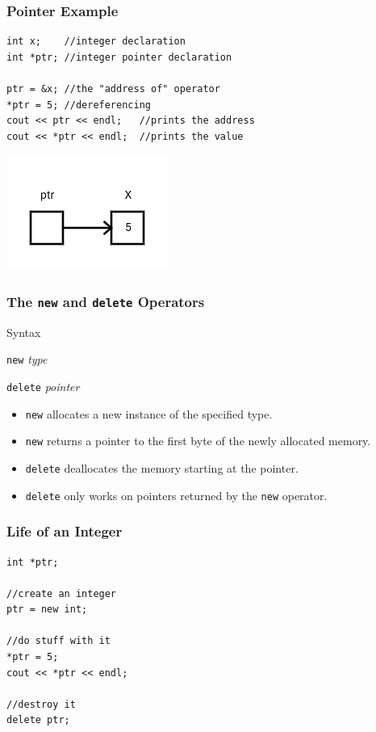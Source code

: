 \documentclass[handout]{beamer}
\begin{document}
\begin{frame}[fragile]
    \frametitle{Pointer Example}
    \begin{verbatim}
int x;    //integer declaration
int *ptr; //integer pointer declaration

ptr = &x; //the "address of" operator
*ptr = 5; //dereferencing 
cout << ptr << endl;   //prints the address
cout << *ptr << endl;  //prints the value
    \end{verbatim}
    \begin{center}
       \includegraphics[height=0.25\textheight]{images/varptr}
    \end{center}
\end{frame}


\begin{frame}
    \frametitle{The {\tt new} and {\tt delete} Operators}
    \begin{block}{Syntax}
        \par{\tt new} {\em type}
        \par{\tt delete} {\em pointer}
    \end{block}
    \begin{itemize}
        \item {\tt new} allocates a new instance of the specified type.
        \item {\tt new} returns a pointer to the first byte of the newly 
            allocated memory.
        \item {\tt delete} deallocates the memory starting at the pointer.
        \item {\tt delete} only works on pointers returned by the {\tt new}
            operator.
    \end{itemize}
\end{frame}

\begin{frame}[fragile]
    \frametitle{Life of an Integer}
    \begin{verbatim}
int *ptr;

//create an integer
ptr = new int;

//do stuff with it
*ptr = 5;
cout << *ptr << endl;

//destroy it
delete ptr;
    \end{verbatim}
\end{frame}
\end{document}
